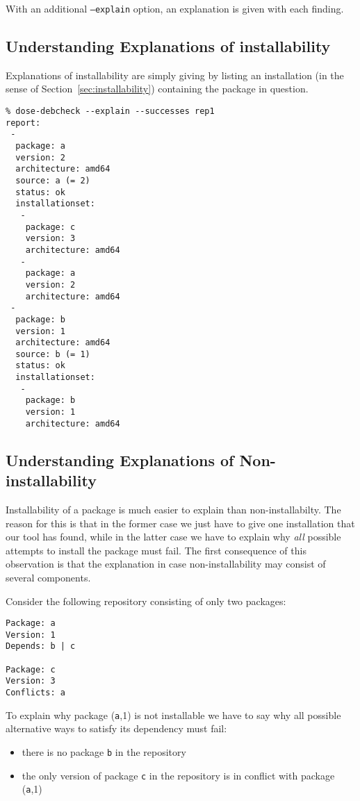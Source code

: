 With an additional \texttt{--explain} option, an explanation is given
with each finding. 

\subsection{Understanding Explanations of installability}

Explanations of installability are simply giving by listing an
installation (in the sense of Section~\ref{sec:installability})
containing the package in question.

\begin{example}
\begin{verbatim}
% dose-debcheck --explain --successes rep1
report:
 -
  package: a
  version: 2
  architecture: amd64
  source: a (= 2)
  status: ok
  installationset:
   -
    package: c
    version: 3
    architecture: amd64
   -
    package: a
    version: 2
    architecture: amd64
 -
  package: b
  version: 1
  architecture: amd64
  source: b (= 1)
  status: ok
  installationset:
   -
    package: b
    version: 1
    architecture: amd64
\end{verbatim}
\end{example}

\subsection{Understanding Explanations of Non-installability}

Installability of a package is much easier to explain than
non-installabilty. The reason for this is that in the former case we
just have to give one installation that our tool has found, while in
the latter case we have to explain why \emph{all} possible attempts to
install the package must fail. The first consequence of this
observation is that the explanation in case non-installability may
consist of several components.

\begin{example}
  Consider the following repository consisting of only two packages:
\begin{verbatim}
Package: a
Version: 1
Depends: b | c

Package: c
Version: 3
Conflicts: a
\end{verbatim}
To explain why package (\texttt{a},1) is not installable we have to
say why all possible alternative ways to satisfy its dependency must
fail:
\begin{itemize}
\item there is no package \texttt{b} in the repository
\item the only version of package \texttt{c} in the repository is in
  conflict with package (\texttt{a},1)
\end{itemize}
\end{example}


